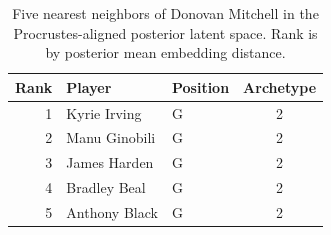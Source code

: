 \begin{table}[htbp]
  \centering\small
  \begin{tabular}{rllc}
    \toprule
    Rank & Player & Position & Archetype \\
    \midrule
    1 & Kyrie Irving & G & 2 \\
    2 & Manu Ginobili & G & 2 \\
    3 & James Harden & G & 2 \\
    4 & Bradley Beal & G & 2 \\
    5 & Anthony Black & G & 2 \\
    \bottomrule
  \end{tabular}
  \caption{Five nearest neighbors of Donovan Mitchell in the Procrustes-aligned posterior latent space. Rank is by posterior mean embedding distance.}
  \label{tab:Donovan_Mitchell_neighbors}
\end{table}

